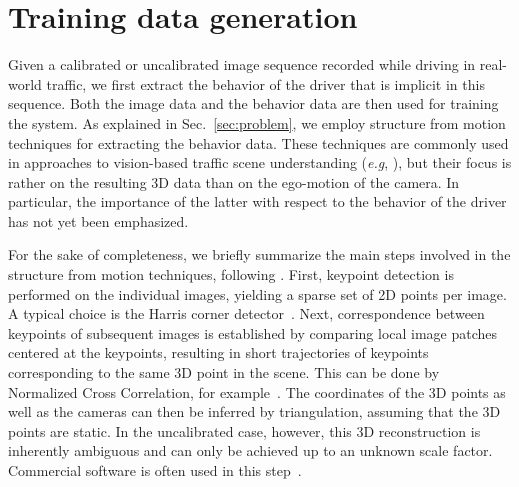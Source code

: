 \documentclass{bmvc2k}
\def\eg{\emph{e.g}\bmvaOneDot}
\begin{document}
%
%

\section{Training data generation}
\label{sec:training}

Given a calibrated or uncalibrated image sequence recorded while driving in real-world traffic, we first extract the behavior of the driver that is implicit in this sequence. Both the image data and the behavior data are then used for training the system. As explained in Sec.~\ref{sec:problem}, we employ structure from motion techniques for extracting the behavior data. These techniques are commonly used in approaches to vision-based traffic scene understanding (\eg, \cite{brostow08, brostow09}), but their focus is rather on the resulting 3D data than on the ego-motion of the camera. In particular, the importance of the latter with respect to the behavior of the driver has not yet been emphasized. 

For the sake of completeness, we briefly summarize the main steps involved in the structure from motion techniques, following \cite{brostow08}. First, keypoint detection is performed on the individual images, yielding a sparse set of 2D points per image. A typical choice is the Harris corner detector~\cite{harris}. Next, correspondence between keypoints of subsequent images is established by comparing local image patches centered at the keypoints, resulting in short trajectories of keypoints corresponding to the same 3D point in the scene. This can be done by Normalized Cross Correlation, for example~\cite{ncc}. The coordinates of the 3D points as well as the cameras can then be inferred by triangulation, assuming that the 3D points are static. In the uncalibrated case, however, this 3D reconstruction is inherently ambiguous and can only be achieved up to an unknown scale factor. Commercial software is often used in this step~\cite{boujou}. 
\end{document}
